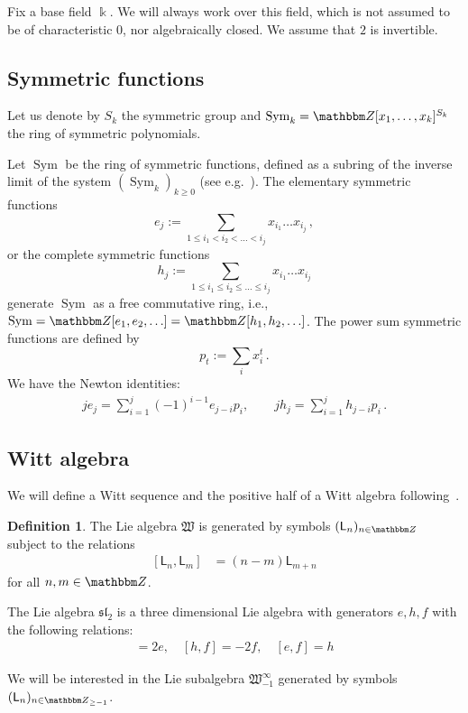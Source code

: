 \documentclass{amsart}
\numberwithin{equation}{section}
\theoremstyle{definition}
\newtheorem{definition}[thm]{Definition}
\def\Z{{\mathbbm Z}}
\newcommand{\elem}{e}
\newcommand{\Sym}{\operatorname{Sym}}
\newcommand{\witt}{{\mathfrak{W}}}
\newcommand{\LLn}[1][n]{{\mathsf{L}_{#1}}}
\newcommand{\ourwitt}{{\witt_{-1}^{\infty}}}
\begin{document}
Fix a base field $\Bbbk$. We will always work over this field, which is not assumed to be of characteristic 0, nor algebraically closed. We assume that $2$ is invertible. 

\subsection{Symmetric functions} \label{subsec_sympoly}

Let us denote by $S_k$ the symmetric group and $\Sym_k=\Z[x_1, \dots,x_k]^{S_k}$
the ring of symmetric polynomials.

Let $\Sym$ be the ring of symmetric functions, defined as a subring of
the inverse limit of the system $(\Sym_k)_{k\ge0}$ (see
e.g.~\cite{McD}).  The elementary symmetric functions
$$
e_j:=\sum_{1\leq i_1<i_2<\dots<i_j} x_{i_1}\dots x_{i_j}\,,
$$
or the complete symmetric functions
$$
h_j:=\sum_{1\leq i_1\leq i_2\leq\dots\leq i_j} x_{i_1}\dots x_{i_j}
$$
generate $\Sym$ as a free commutative ring, i.e.,
$\Sym=\Z[\elem_1,\elem_2,\ldots]=\Z[h_1,h_2,\ldots]$.
The power sum symmetric functions are defined by
$$
p_t:=\sum_i x_i^t\,.
$$
We have the Newton identities:
\begin{gather} \label{eq:Newton}
  j\elem_j=\sum_{i=1}^j(-1)^{i-1}\elem_{j-i}p_i,  \qquad 
  jh_j=\sum_{i=1}^jh_{j-i}p_i\, .
\end{gather}


\subsection{Witt algebra}
We will define a Witt sequence and the positive half of a Witt algebra following~\cite[Section 3]{qi2024symmetriesmathfrakglnfoams}. 

\begin{definition}
The Lie algebra $\witt$ is generated by symbols $(\LLn)_{n \in \Z}$
subject to the relations
\begin{align}
  \label{eq:witt-relations}
 [\LLn, \LLn[m]] 
  &= (n-m) \LLn[m+n]
\end{align}
for all $n, m\in \Z$.

The Lie algebra $\mathfrak{sl}_2$ is a three dimensional Lie algebra with generators $e, h, f$ with the following relations:
\begin{align}
    [h, e] = 2e, \quad [h, f] = -2f, \quad [e, f] = h
\end{align}
\end{definition}
We will be interested in the Lie subalgebra $\ourwitt$ generated by symbols $(\LLn)_{n\in \Z_{\geq -1}}$.
\end{document}
